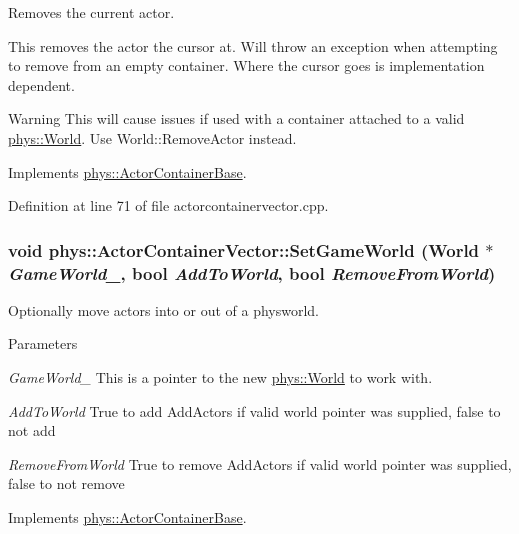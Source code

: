 Removes the current actor. 

This removes the actor the cursor at. Will throw an exception when attempting to remove from an empty container. Where the cursor goes is implementation dependent. \begin{DoxyWarning}{Warning}
This will cause issues if used with a container attached to a valid \hyperlink{classphys_1_1World}{phys::World}. Use World::RemoveActor instead. 
\end{DoxyWarning}


Implements \hyperlink{classphys_1_1ActorContainerBase_a60f37a056e8750f3b389c5ceed14520c}{phys::ActorContainerBase}.



Definition at line 71 of file actorcontainervector.cpp.

\hypertarget{classphys_1_1ActorContainerVector_a721d0cde6fc4f1e8d3b33867cd5c82df}{
\subsubsection[{SetGameWorld}]{\setlength{\rightskip}{0pt plus 5cm}void phys::ActorContainerVector::SetGameWorld ({\bf World} $\ast$ {\em GameWorld\_\-}, \/  bool {\em AddToWorld}, \/  bool {\em RemoveFromWorld})}}
\label{d3/d64/classphys_1_1ActorContainerVector_a721d0cde6fc4f1e8d3b33867cd5c82df}


Optionally move actors into or out of a physworld. 


\begin{DoxyParams}{Parameters}
\item[{\em GameWorld\_\-}]This is a pointer to the new \hyperlink{classphys_1_1World}{phys::World} to work with. \item[{\em AddToWorld}]True to add AddActors if valid world pointer was supplied, false to not add \item[{\em RemoveFromWorld}]True to remove AddActors if valid world pointer was supplied, false to not remove \end{DoxyParams}


Implements \hyperlink{classphys_1_1ActorContainerBase_a366c1797bef08f3a1846bf010e2e2b04}{phys::ActorContainerBase}.



